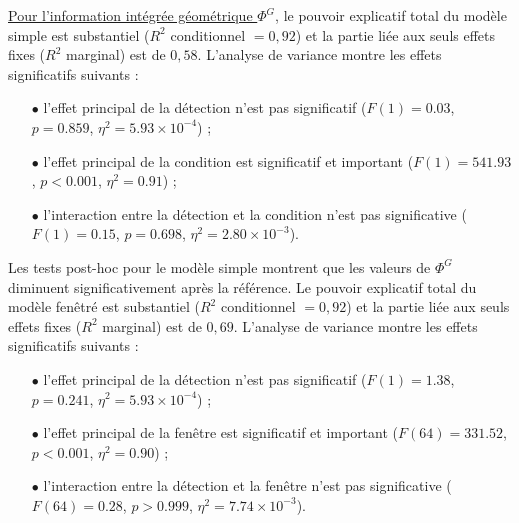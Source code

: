 \underline{Pour l'information intégrée géométrique $\Phi^{G}$}, le pouvoir explicatif total du modèle simple est substantiel ($R^2$ conditionnel $=0,92$) et la partie liée aux seuls effets fixes ($R^2$ marginal) est de $0,58$. 
L'analyse de variance montre les effets significatifs suivants :
\begin{itemize}
\item[$\bullet$] l'effet principal de la détection n'est pas significatif ($F(1)=0.03$, $p=0.859$, $\eta^2=5.93\times10^{-4}$) ; 
\item[$\bullet$] l'effet principal de la condition est significatif et important ($F(1)=541.93$, $p<0.001$, $\eta^2=0.91$) ; 
\item[$\bullet$] l'interaction entre la détection et la condition n'est pas significative ($F(1)=0.15$, $p=0.698$, $\eta^2=2.80\times10^{-3}$). 
\end{itemize}
Les tests post-hoc pour le modèle simple montrent que les valeurs de $\Phi^{G}$ diminuent significativement après la référence. 
Le pouvoir explicatif total du modèle fenêtré est substantiel ($R^2$ conditionnel $=0,92$) et la partie liée aux seuls effets fixes ($R^2$ marginal) est de $0,69$. 
L'analyse de variance montre les effets significatifs suivants : 
\begin{itemize}
\item[$\bullet$] l'effet principal de la détection n'est pas significatif ($F(1)=1.38$, $p=0.241$, $\eta^2=5.93\times10^{-4}$) ; 
\item[$\bullet$] l'effet principal de la fenêtre est significatif et important ($F(64)=331.52$, $p<0.001$, $\eta^2=0.90$) ; 
\item[$\bullet$] l'interaction entre la détection et la fenêtre n'est pas significative ($F(64)=0.28$, $p>0.999$, $\eta^2=7.74\times10^{-3}$). \\
\end{itemize}


